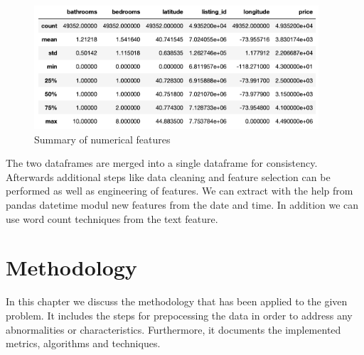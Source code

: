 \documentclass[runningheads]{llncs}
\begin{document}
    \begin{figure}[h!]
      \centering
      \includegraphics[width=300pt]{describe.png}
      \caption{Summary of numerical features}
      \label{fig:describe}
    \end{figure}
    \newpage
    The two dataframes are merged into a single dataframe for consistency. Afterwards additional steps like data cleaning and feature selection can be performed as well as engineering of features. We can extract with the help from pandas datetime modul new features from the date and time. In addition we can use word count techniques from the text feature.
      
    
    
	
	
	\newpage
	\section{Methodology}
	In this chapter we discuss the methodology that has been applied to the given problem. It includes the steps for prepocessing the data in order to address any abnormalities or characteristics. Furthermore, it documents the implemented metrics, algorithms and techniques.
	
\end{document}
